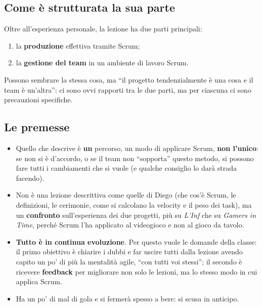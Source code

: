 \subsection{Come è strutturata la sua parte}

Oltre all'esperienza personale, la lezione ha due parti principali:
\begin{enumerate}
  \item la \textbf{produzione} effettiva tramite Scrum;
  \item la \textbf{gestione del team} in un ambiente di lavoro Scrum.
\end{enumerate}
Possono sembrare la stessa cosa, ma ``il progetto tendenzialmente è una cosa
e il team è un'altra'': ci sono ovvi rapporti tra le due parti, ma per
ciascuna ci sono precauzioni specifiche.

\subsection{Le premesse}

\begin{itemize}
  \item Quello che descrive è \textbf{un} percorso, un modo di applicare
        Scrum, \textbf{non l'unico}: se non si è d'accordo, o se il team non
        ``sopporta'' questo metodo, si possono fare tutti i cambiamenti che si
        vuole (e qualche consiglio lo darà strada facendo).
  \item Non è una lezione descrittiva come quelle di Diego (che cos'è Scrum,
        le definizioni, le cerimonie, come si calcolano la velocity e il peso
        dei task), ma un \textbf{confronto} sull'esperienza dei due progetti,
        più su \emph{L'Inf} che su \emph{Gamers in Time}, perché Scrum l'ha
        applicato al videogioco e non al gioco da tavolo.
  \item \textbf{Tutto è in continua evoluzione}. Per questo vuole le domande
        della classe: il primo obiettivo è chiarire i dubbi e far uscire tutti
        dalla lezione avendo capito un po' di più la mentalità agile, ``con
        tutti voi stessi''; il secondo è ricevere \textbf{feedback} per
        migliorare non solo le lezioni, ma lo stesso modo in cui applica
        Scrum.
  \item Ha un po' di mal di gola e si fermerà spesso a bere: si scusa in
        anticipo.
\end{itemize}

